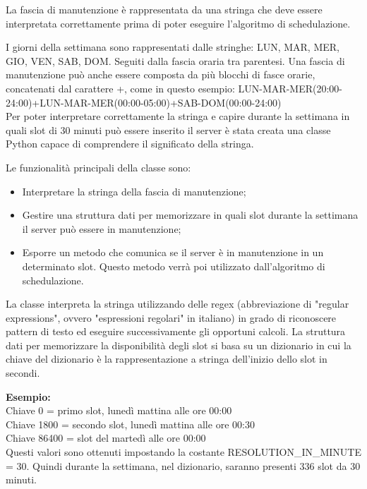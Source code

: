 La fascia di manutenzione è rappresentata da una stringa che deve essere 
interpretata correttamente prima di poter eseguire l’algoritmo di schedulazione. 

I giorni della settimana sono rappresentati dalle stringhe: 
LUN, MAR, MER, GIO, VEN, SAB, DOM. Seguiti dalla fascia oraria tra parentesi.
Una fascia di manutenzione può anche essere composta da più blocchi di fasce 
orarie, concatenati dal carattere +, come in questo esempio: 
LUN-MAR-MER(20:00-24:00)+LUN-MAR-MER(00:00-05:00)+SAB-DOM(00:00-24:00)\\

Per poter interpretare correttamente la stringa e capire durante la settimana in quali 
slot di 30 minuti può essere inserito il server è stata creata una classe 
Python capace di comprendere il significato della stringa.

Le funzionalità principali della classe sono:
\begin{itemize}
\item Interpretare la stringa della fascia di manutenzione;
\item Gestire una struttura dati per memorizzare in quali slot durante la 
settimana il server può essere in manutenzione;
\item Esporre un metodo che comunica se il server è in manutenzione in un 
determinato slot. Questo metodo verrà poi utilizzato dall’algoritmo di schedulazione.
\end{itemize}

La classe interpreta la stringa utilizzando delle regex (abbreviazione di 
"regular expressions", ovvero "espressioni regolari" in italiano) in grado di 
riconoscere pattern di testo ed eseguire successivamente gli opportuni calcoli.
La struttura dati per memorizzare la disponibilità degli slot si basa su un 
dizionario in cui la chiave del dizionario è la rappresentazione a stringa 
dell’inizio dello slot in secondi.

\textbf{Esempio:}\\
Chiave 0 = primo slot, lunedì mattina alle ore 00:00\\
Chiave 1800 = secondo slot, lunedì mattina alle ore 00:30\\
Chiave 86400 = slot del martedì alle ore 00:00\\

Questi valori sono ottenuti impostando la costante RESOLUTION\_IN\_MINUTE = 30. 
Quindi durante la settimana, nel dizionario, saranno presenti 336 slot da 30 minuti.

